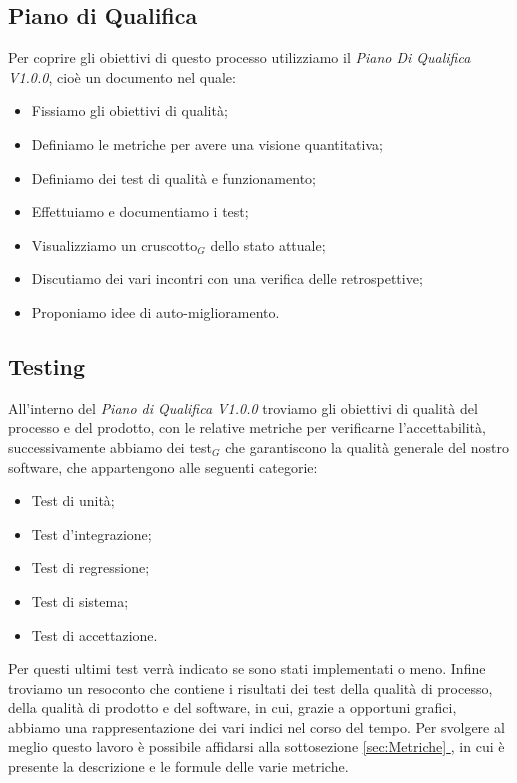   \subsection{Piano di Qualifica}
  Per coprire gli obiettivi di questo processo utilizziamo il \textit{Piano Di Qualifica V1.0.0}, cioè un documento nel quale:
  \begin{itemize}
      \item Fissiamo gli obiettivi di qualità;
      \item Definiamo le metriche per avere una visione quantitativa;
      \item Definiamo dei test di qualità e funzionamento;
      \item Effettuiamo e documentiamo i test;
      \item Visualizziamo un cruscotto$_G$ dello stato attuale;
      \item Discutiamo dei vari incontri con una verifica delle retrospettive;
      \item Proponiamo idee di auto-miglioramento.
  \end{itemize}

  \subsection{Testing}
  All'interno del \textit{Piano di Qualifica V1.0.0} troviamo gli obiettivi di qualità del processo e del prodotto, con le relative metriche per verificarne l'accettabilità, successivamente abbiamo dei test$_G$ che garantiscono la qualità generale del nostro software, che appartengono alle seguenti categorie:
  \begin{itemize}
      \item Test di unità;
      \item Test d'integrazione;
      \item Test di regressione;
      \item Test di sistema;
      \item Test di accettazione.
  \end{itemize}
  Per questi ultimi test verrà indicato se sono stati implementati o meno.
  \newline
  Infine troviamo un resoconto che contiene i risultati dei test della qualità di processo, della qualità di prodotto e del software, in cui, grazie a opportuni grafici, abbiamo una rappresentazione dei vari indici nel corso del tempo. Per svolgere al meglio questo lavoro è possibile affidarsi alla sottosezione \underline{\ref{sec:Metriche} }, in cui è presente la descrizione e le formule delle varie metriche.


